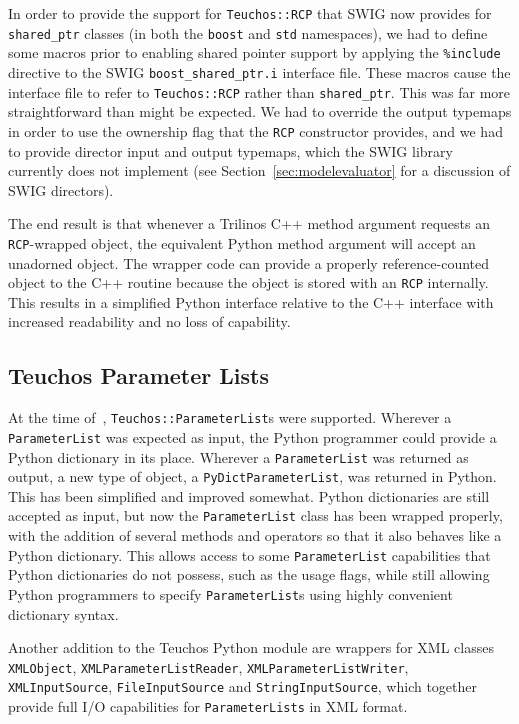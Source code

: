 \documentclass[11pt]{article}
\begin{document}
In order to provide the support for {\tt Teuchos::RCP} that SWIG now provides for {\tt shared\_ptr} classes (in both the {\tt boost} and {\tt std} namespaces), we had to define some macros prior to enabling shared pointer support by applying the {\tt \%include} directive to the SWIG {\tt boost\_shared\_ptr.i} interface file. These macros cause the interface file to refer to {\tt Teuchos::RCP} rather than {\tt shared\_ptr}.  This was far more straightforward than might be expected.  We had to override the output typemaps in order to use the ownership flag that the {\tt RCP} constructor provides, and we had to provide director input and output typemaps, which the SWIG library currently does not implement (see Section~\ref{sec:modelevaluator} for a discussion of SWIG directors).

The end result is that whenever a Trilinos C++ method argument requests an {\tt RCP}-wrapped object, the equivalent Python method argument will accept an unadorned object.  The wrapper code can provide a properly reference-counted object to the C++ routine because the object is stored with an {\tt RCP} internally.  This results in a simplified Python interface relative to the C++ interface with increased readability and no loss of capability.

\subsection{Teuchos Parameter Lists}
\label{sec:teuchos_parameterlists}

At the time of~\cite{PyTrilinos}, {\tt Teuchos::ParameterList}s were supported.  Wherever a {\tt ParameterList} was expected as input, the Python programmer could provide a Python dictionary in its place.  Wherever a {\tt ParameterList} was returned as output, a new type of object, a {\tt PyDictParameterList}, was returned in Python.  This has been simplified and improved somewhat.  Python dictionaries are still accepted as input, but now the {\tt ParameterList} class has been wrapped properly, with the addition of several methods and operators so that it also behaves like a Python dictionary.  This allows access to some {\tt ParameterList} capabilities that Python dictionaries do not possess, such as the usage flags, while still allowing Python programmers to specify {\tt ParameterList}s using highly convenient dictionary syntax.

Another addition to the Teuchos Python module are wrappers for XML classes {\tt XMLObject}, {\tt XMLPa\-rameterListReader}, {\tt XMLParameterListWriter}, {\tt XMLInputSource}, {\tt FileInputSource} and {\tt String\-InputSource}, which together provide full I/O capabilities for {\tt ParameterLists} in XML format.
\end{document}
